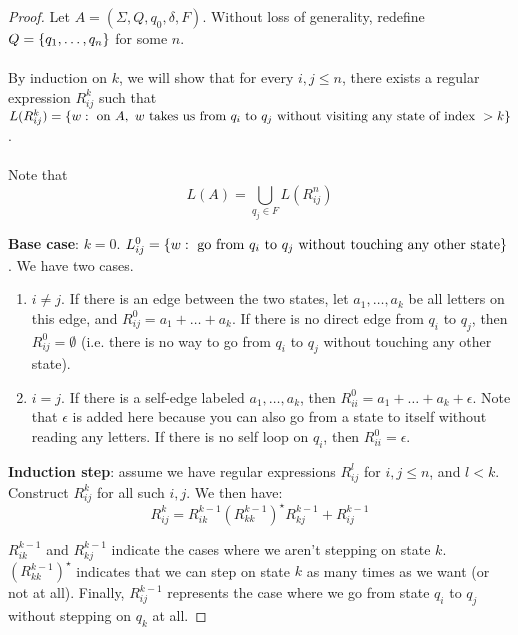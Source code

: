 \documentclass[]{article}
\DeclarePairedDelimiter{\set}{\lbrace}{\rbrace}
\theoremstyle{definition}
\begin{document}
        \begin{proof}
          Let $A = (\Sigma, Q, q_0, \delta, F)$. Without loss of generality, redefine $Q = \set{ q_1, \ldots, q_n }$ for some $n$.
          \\ \\
          By induction on $k$, we will show that for every $i, j \le n$, there exists a regular expression $R_{ij}^k$ such that $L(R_{ij}^k) = \set{ w : \text{ on } A,~ w \text{ takes us from } q_i \text{ to } q_j \text{ without visiting any state of index } > k}$.
          \\ \\
          Note that
          $$
            L(A) = \bigcup_{q_j \in F} L(R_{ij}^n)
          $$

          \textbf{Base case}: $k = 0$. $L_{ij}^0 = \set{ w : \text{ go from } q_i \text{ to } q_j \text{ without touching any other state}}$. We have two cases.

          \begin{enumerate}
            \item $i \ne j$. If there is an edge between the two states, let $a_1, \ldots, a_k$ be all letters on this edge, and $R_{ij}^0 = a_1 + \ldots + a_k$. If there is no direct edge from $q_i$ to $q_j$, then $R_{ij}^0 = \emptyset$ (i.e. there is no way to go from $q_i$ to $q_j$ without touching any other state).
            \item $i = j$. If there is a self-edge labeled $a_1, \ldots, a_k$, then $R_{ii}^0 = a_1 + \ldots + a_k + \epsilon$. Note that $\epsilon$ is added here because you can also go from a state to itself without reading any letters. If there is no self loop on $q_i$, then $R_{ii}^0 = \epsilon$.
          \end{enumerate}

          \textbf{Induction step}: assume we have regular expressions $R_{ij}^l$ for $i, j \le n$, and $l < k$. Construct $R_{ij}^k$ for all such $i, j$. We then have:
          $$
            R_{ij}^k = R_{ik}^{k - 1} (R_{kk}^{k - 1})^\star R_{kj}^{k - 1} + R_{ij}^{k - 1}
          $$

          $R_{ik}^{k - 1}$ and $R_{kj}^{k - 1}$ indicate the cases where we aren't stepping on state $k$. $(R_{kk}^{k - 1})^\star$ indicates that we can step on state $k$ as many times as we want (or not at all). Finally, $R_{ij}^{k - 1}$ represents the case where we go from state $q_i$ to $q_j$ without stepping on $q_k$ at all.
        \end{proof}
\end{document}
